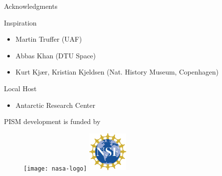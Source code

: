 \documentclass[hide notes,intlimits]{beamer}
\begin{document}
\begin{frame}{Acknowledgments}
  \begin{block}{Inspiration}
    \begin{itemize}
      \item Martin Truffer (UAF)
      \item Abbas Khan (DTU Space)
      \item Kurt Kj{\ae}r, Kristian Kjeldsen (Nat. History Museum, Copenhagen)
    \end{itemize}
  \end{block}
  \begin{block}{Local Host}
    \begin{itemize}
      \item Antarctic Research Center
    \end{itemize}
  \end{block}
  \begin{block}{PISM development is funded by}
    \begin{figure}
      \texttt{[image: nasa-logo]} \hspace{.5em}
      \includegraphics[width=2cm]{NSF-logo-color}
    \end{figure}
  \end{block}
\end{frame}
\end{document}
